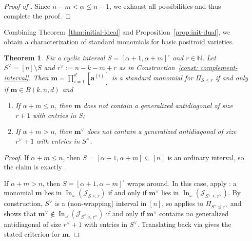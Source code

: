 \documentclass[12pt,reqno]{amsart}
\newtheorem{theorem}[lemma]{Theorem}
\theoremstyle{definition}
\newcommand{\inn}{\operatorname{In}}
\renewcommand{\aa}{\mathbf a}
\newcommand{\mm}{\mathbf m}
\newcommand{\cJ}{\mathcal{J}}
\begin{document}
{\begin{proof}[Proof of ]
    Since $n-m<\alpha\leq n-1$, we exhaust all possibilities and thus complete the proof.
\end{proof}

 Combining Theorem~\ref{thm:initial-ideal} and Proposition~\ref{prop:init-dual}, we obtain a characterization of standard monomials for basic positroid varieties.
\begin{theorem}\label{thm:basic-std-mon}
Fix a cyclic interval $S = [\alpha+1,\alpha+m]^\circ$ and $r\in \mathbb{N}$.
Let \(S^\vee=[n]\setminus S\) and \(r^\vee:=n-k-m+r\) as in Construction~\ref{const: complement-interval}.
Then $\mm = \prod_{i = 1}^{d}[\aa^{(i)}]$ is a standard monomial for $\Pi_{S\leq r}$ if and only if $\mm\in B(k,n,d)$ and 
    \begin{enumerate}
        \item If $\alpha+m\leq n$, then $\mm$ does not contain a generalized antidiagonal of size $r+1$ with entries in $S$;
        \item If $\alpha+m>n$, then $\mm^\vee$ does not contain a generalized antidiagonal of size $r^\vee+1$ with entries in $S^\vee$.
    \end{enumerate}
\end{theorem}

\begin{proof}
If $\alpha+m\le n$, then $S=[\alpha+1,\alpha+m]\subseteq [n]$ is an ordinary interval, so the claim is exactly .

If $\alpha+m>n$, then $S=[\alpha+1,\alpha+m]^\circ$ wraps around. In this case, apply : a monomial $\mm$ lies in $\inn_\omega(\cJ_{S\le r})$ if and only if $\mm^\vee$ lies in $\inn_\omega(\cJ_{S^\vee\le r^\vee})$. By construction, $S^\vee$ is a (non-wrapping) interval in $[n]$, so  applies to $\Pi_{S^\vee\le r^\vee}$ and shows that $\mm^\vee\notin \inn_\omega(\cJ_{S^\vee\le r^\vee})$ if and only if $\mm^\vee$ contains no generalized antidiagonal of size $r^\vee+1$ with entries in $S^\vee$. Translating back via  gives the stated criterion for $\mm$.
\end{proof}

}
\end{document}

